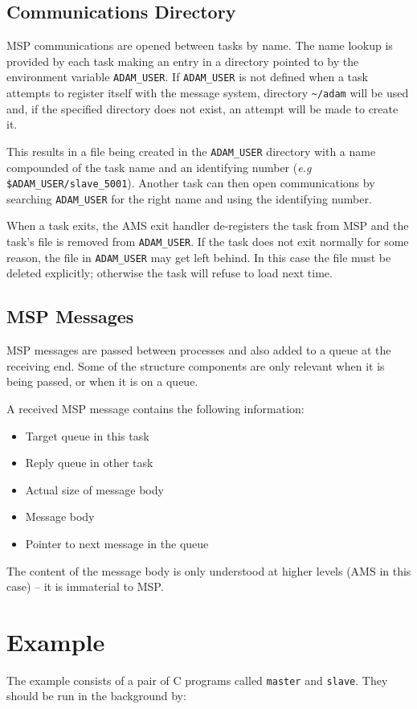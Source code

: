 \documentclass[twoside,11pt,nolof]{starlink}
\begin{document}
\subsection{Communications Directory}
MSP communications are opened between tasks by name.
The name lookup is provided by
each task making an entry in a directory pointed to by the environment
variable \texttt{ADAM\_USER}. If \texttt{ADAM\_USER} is not defined when a task
attempts to register itself with the message system, directory \texttt{\~{}/adam}
will be used and, if the specified directory does not exist, an attempt will
be made to create it.

This results in a file being created in the \texttt{ADAM\_USER} directory
with a name compounded of the task name and an identifying number
(\textit{e.g} \texttt{\$ADAM\_USER/slave\_5001}).
Another task can then open communications by searching \texttt{ADAM\_USER} for
the right name and using the identifying number.

When a task exits, the AMS exit handler de-registers the task from MSP and
the task's file is removed from \texttt{ADAM\_USER}.
If the task does not exit normally for some reason, the file in
\texttt{ADAM\_USER} may get left behind.
In this case the file must be deleted explicitly; otherwise the
task will refuse to load next time.

\subsection{MSP Messages}
MSP messages are passed between processes and also added to a queue at the
receiving end. Some of the structure components are only relevant when it is
being passed, or when it is on a queue.

A received MSP message contains the following information:
\begin{itemize}
\item Target queue in this task
\item Reply queue in other task
\item Actual size of message body
\item Message body
\item Pointer to next message in the queue
\end{itemize}
The content of the message body is only understood at higher levels (AMS in
this case) -- it is immaterial to MSP.

\newpage
\appendix
\section{\label{example}Example}
The example consists of a pair of C programs called \texttt{master} and
\texttt{slave}.
They should be run in the background by:
\begin{quote}
\begin{terminalv}
\end{terminalv}
\end{quote}
\end{document}
